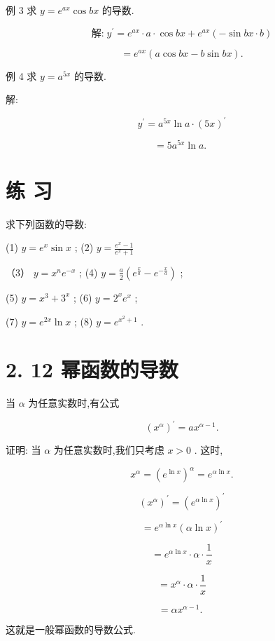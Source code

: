 \documentclass[10pt]{article}
\begin{document}
例 3 求 \(y = {e}^{ax}\cos {bx}\) 的导数.

\[
\text{解:}\;{y}^{\prime } = {e}^{ax} \cdot a \cdot \cos {bx} + {e}^{ax}\left( {-\sin {bx} \cdot b}\right)
\]

\[
= {e}^{ax}\left( {a\cos {bx} - b\sin {bx}}\right) \text{.}
\]

例 4 求 \(y = {a}^{5x}\) 的导数.

解:

\[
{y}^{\prime } = {a}^{5x}\ln a \cdot {\left( 5x\right) }^{\prime }
\]

\[
= 5{a}^{5x}\ln a\text{. }
\]

\section*{练 习}

求下列函数的导数:

(1) \(y = {e}^{x}\sin x\) ; (2) \(y = \frac{{e}^{x} - 1}{{e}^{x} + 1}\)

（3） \(y = {x}^{n}{e}^{-x}\) ; (4) \(y = \frac{a}{2}\left( {{e}^{\frac{x}{a}} - {e}^{-\frac{x}{a}}}\right)\) ;

(5) \(y = {x}^{3} + {3}^{x}\) ; (6) \(y = {2}^{x}{e}^{x}\) ;

(7) \(y = {e}^{2x}\ln x\) ; (8) \(y = {e}^{{x}^{2} + 1}\) .

\section*{2. 12 幂函数的导数}

当 \(\alpha\) 为任意实数时,有公式

\[
{\left( {x}^{\alpha }\right) }^{\prime } = a{x}^{\alpha - 1}.
\]

证明: 当 \(\alpha\) 为任意实数时,我们只考虑 \(x > 0\) . 这时,

\[
{x}^{\alpha } = {\left( {e}^{\ln x}\right) }^{\alpha } = {e}^{\alpha \ln x}.
\]

\[
{\left( {x}^{\alpha }\right) }^{\prime } = {\left( {e}^{\alpha \ln x}\right) }^{\prime }
\]

\[
= {e}^{\alpha \ln x}{\left( \alpha \ln x\right) }^{\prime }
\]

\[
= {e}^{\alpha \ln x} \cdot \alpha \cdot \frac{1}{x}
\]

\[
= {x}^{\alpha } \cdot \alpha \cdot \frac{1}{x}
\]

\[
= \alpha {x}^{\alpha - 1}\text{. }
\]

这就是一般幂函数的导数公式.
\end{document}
